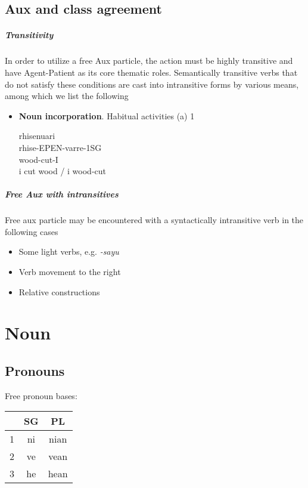 \documentclass[8pt]{book}
\begin{document}
\section{Aux and class agreement}

\paragraph{Transitivity}
In order to utilize a free Aux particle, the action must be highly transitive and have Agent-Patient as its core thematic roles. Semantically transitive verbs that do not satisfy these conditions are cast into intransitive forms by various means, among which we list the following

\begin{itemize}
\item \textbf{Noun incorporation}. Habitual activities (a)
1  
  \begin{xlista}
    \ex rhisenuari \\
        rhise-EPEN-varre-1SG \\
        wood-cut-I \\
        i cut wood / i wood-cut
  \end{xlista}

\end{itemize}

\paragraph{Free Aux with intransitives}
Free aux particle may be encountered with a syntactically intransitive verb in the following cases

\begin{itemize}
\item Some light verbs, e.g. \textit{-sayu} 
\item Verb movement to the right
\item Relative constructions
\end{itemize}


\chapter{Noun}

\section{Pronouns}

\begin{center}
Free pronoun bases:

\begin{tabular}{l|c|c}
	\hline
	& SG & PL \\\hline
	1 & ni & nian \\\hline
	2 & ve & vean \\\hline
	3 & he & hean \\\hline
\end{tabular}

\end{center}
\end{document}
